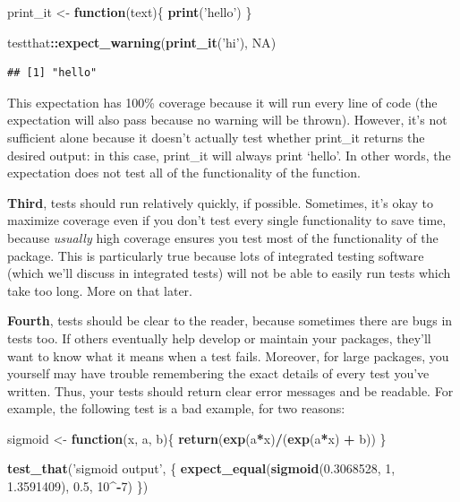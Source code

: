 \documentclass[]{book}
\newenvironment{Shaded}{\begin{snugshade}}{\end{snugshade}}
\newcommand{\KeywordTok}[1]{\textcolor[rgb]{0.13,0.29,0.53}{\textbf{#1}}}
\newcommand{\DecValTok}[1]{\textcolor[rgb]{0.00,0.00,0.81}{#1}}
\newcommand{\FloatTok}[1]{\textcolor[rgb]{0.00,0.00,0.81}{#1}}
\newcommand{\StringTok}[1]{\textcolor[rgb]{0.31,0.60,0.02}{#1}}
\newcommand{\OtherTok}[1]{\textcolor[rgb]{0.56,0.35,0.01}{#1}}
\newcommand{\ControlFlowTok}[1]{\textcolor[rgb]{0.13,0.29,0.53}{\textbf{#1}}}
\newcommand{\OperatorTok}[1]{\textcolor[rgb]{0.81,0.36,0.00}{\textbf{#1}}}
\newcommand{\NormalTok}[1]{#1}
\begin{document}
\begin{Shaded}
\begin{Highlighting}[]
\NormalTok{print_it <-}\StringTok{ }\ControlFlowTok{function}\NormalTok{(text)\{}
  \KeywordTok{print}\NormalTok{(}\StringTok{'hello'}\NormalTok{)}
\NormalTok{\}}

\NormalTok{testthat}\OperatorTok{::}\KeywordTok{expect_warning}\NormalTok{(}\KeywordTok{print_it}\NormalTok{(}\StringTok{'hi'}\NormalTok{), }\OtherTok{NA}\NormalTok{)}
\end{Highlighting}
\end{Shaded}

\begin{verbatim}
## [1] "hello"
\end{verbatim}

This expectation has 100\% coverage because it will run every line of
code (the expectation will also pass because no warning will be thrown).
However, it's not sufficient alone because it doesn't actually test
whether print\_it returns the desired output: in this case, print\_it
will always print `hello'. In other words, the expectation does not test
all of the functionality of the function.

\textbf{Third}, tests should run relatively quickly, if possible.
Sometimes, it's okay to maximize coverage even if you don't test every
single functionality to save time, because \emph{usually} high coverage
ensures you test most of the functionality of the package. This is
particularly true because lots of integrated testing software (which
we'll discuss in integrated tests) will not be able to easily run tests
which take too long. More on that later.

\textbf{Fourth}, tests should be clear to the reader, because sometimes
there are bugs in tests too. If others eventually help develop or
maintain your packages, they'll want to know what it means when a test
fails. Moreover, for large packages, you yourself may have trouble
remembering the exact details of every test you've written. Thus, your
tests should return clear error messages and be readable. For example,
the following test is a bad example, for two reasons:

\begin{Shaded}
\begin{Highlighting}[]
\NormalTok{sigmoid <-}\StringTok{ }\ControlFlowTok{function}\NormalTok{(x, a, b)\{}
  \KeywordTok{return}\NormalTok{(}\KeywordTok{exp}\NormalTok{(a}\OperatorTok{*}\NormalTok{x)}\OperatorTok{/}\NormalTok{(}\KeywordTok{exp}\NormalTok{(a}\OperatorTok{*}\NormalTok{x) }\OperatorTok{+}\StringTok{ }\NormalTok{b))}
\NormalTok{\}}

\KeywordTok{test_that}\NormalTok{(}\StringTok{'sigmoid output'}\NormalTok{, \{}
  \KeywordTok{expect_equal}\NormalTok{(}\KeywordTok{sigmoid}\NormalTok{(}\FloatTok{0.3068528}\NormalTok{, }\DecValTok{1}\NormalTok{, }\FloatTok{1.3591409}\NormalTok{), }\FloatTok{0.5}\NormalTok{, }\DecValTok{10}\OperatorTok{^-}\DecValTok{7}\NormalTok{)}
\NormalTok{\})}
\end{Highlighting}
\end{Shaded}
\end{document}
